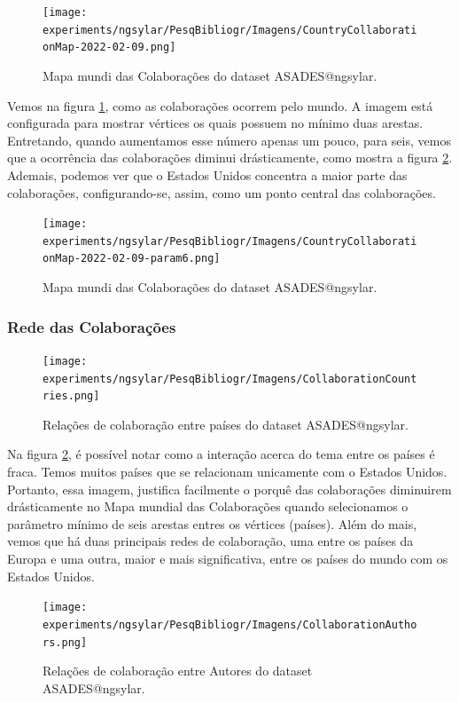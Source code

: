 \begin{figure}[H]
    \centering
\texttt{[image: experiments/ngsylar/PesqBibliogr/Imagens/CountryCollaborationMap-2022-02-09.png]}
    \caption{Mapa mundi das Colaborações do dataset ASADES@ngsylar.}
    \label{fig:ASADES@ngsylar:WorldMap}
\end{figure}

Vemos na figura \ref{fig:ASADES@ngsylar:WorldMap}, como as colaborações ocorrem pelo mundo. A imagem está configurada para mostrar vértices os quais possuem no mínimo duas arestas. Entretando, quando aumentamos esse número apenas um pouco, para seis, vemos que a ocorrência das colaborações diminui drásticamente, como mostra a figura \ref{fig:ASADES@ngsylar:WorldMap2}. Ademais, podemos ver que o Estados Unidos concentra a maior parte das colaborações, configurando-se, assim, como um ponto central das colaborações.


\begin{figure}[H]
    \centering
\texttt{[image: experiments/ngsylar/PesqBibliogr/Imagens/CountryCollaborationMap-2022-02-09-param6.png]}
    \caption{Mapa mundi das Colaborações do dataset ASADES@ngsylar.}
    \label{fig:ASADES@ngsylar:WorldMap2}
\end{figure}

\subsubsection{Rede das Colaborações}

\begin{figure}[H]
    \centering
\texttt{[image: experiments/ngsylar/PesqBibliogr/Imagens/CollaborationCountries.png]}
    \caption{Relações de colaboração entre países do dataset ASADES@ngsylar.}
    \label{fig:ASADES@ngsylar:CollabCountries}
\end{figure}

Na figura \ref{fig:ASADES@ngsylar:WorldMap2}, é possível notar como a interação acerca do tema entre os países é fraca. Temos muitos países que se relacionam unicamente com o Estados Unidos. Portanto, essa imagem, justifica facilmente o porquê das colaborações diminuirem drásticamente no Mapa mundial das Colaborações quando selecionamos o parâmetro mínimo de seis arestas entres os vértices (países). Além do mais, vemos que há duas principais redes de colaboração, uma entre os países da Europa e uma outra, maior e mais significativa, entre os países do mundo com os Estados Unidos. 

\begin{figure}[H]
    \centering
\texttt{[image: experiments/ngsylar/PesqBibliogr/Imagens/CollaborationAuthors.png]}
    \caption{Relações de colaboração entre Autores do dataset ASADES@ngsylar.}
    \label{fig:ASADES@ngsylar:CollabAuthor}
\end{figure}

